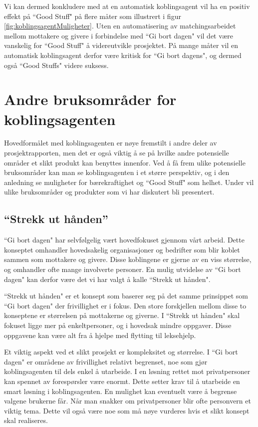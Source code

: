 Vi kan dermed konkludere med at en automatisk koblingsagent vil ha en positiv effekt på ``Good Stuff" på flere måter som illustrert i figur \ref{fig:koblingsagentMuligheter}. Uten en automatisering av matchingsarbeidet mellom mottakere og givere i forbindelse med ``Gi bort dagen" vil det være vanskelig for ``Good Stuff" å videreutvikle prosjektet. På mange måter vil en automatisk koblingsagent derfor være kritisk for ``Gi bort dagens", og dermed også ``Good Stuffs" videre suksess.

\section{Andre bruksområder for koblingsagenten }
Hovedformålet med koblingsagenten er nøye fremstilt i andre deler av prosjektrapporten, men det er også viktig å se på hvilke andre potensielle områder et slikt produkt kan benyttes innenfor. Ved å få frem ulike potensielle bruksområder kan man se koblingsagenten i et større perspektiv, og i den anledning se muligheter for bærekraftighet og ``Good Stuff" som helhet. Under vil ulike bruksområder og produkter som vi har diskutert bli presentert.

\subsection{“Strekk ut hånden”}
``Gi bort dagen" har selvfølgelig vært hovedfokuset gjennom vårt arbeid. Dette konseptet omhandler hovedsakelig organisasjoner og bedrifter som blir koblet sammen som mottakere og givere. Disse koblingene er gjerne av en viss størrelse, og omhandler ofte mange involverte personer. En mulig utvidelse av ``Gi bort dagen" kan derfor være det vi har valgt å kalle ``Strekk ut hånden".

``Strekk ut hånden" er et konsept som baserer seg på det samme prinsippet som ``Gi bort dagen" der frivillighet er i fokus. Den store forskjellen mellom disse to konseptene er størrelsen på mottakerne og giverne. I ``Strekk ut hånden" skal fokuset ligge mer på enkeltpersoner, og i hovedsak mindre oppgaver. Disse oppgavene kan være alt fra å hjelpe med flytting til leksehjelp.

Et viktig aspekt ved et slikt prosjekt er kompleksitet og størrelse. I ``Gi bort dagen" er områdene av frivillighet relativt begrenset, noe som gjør koblingsagenten til dels enkel å utarbeide. I en løsning rettet mot privatpersoner kan spennet av forespørsler være enormt. Dette setter krav til å utarbeide en smart løsning i koblingsagenten. En mulighet kan eventuelt være å begrense valgene brukerne får. Når man snakker om privatpersoner blir ofte personvern et viktig tema. Dette vil også være noe som må nøye vurderes hvis et slikt konsept skal realiseres.

